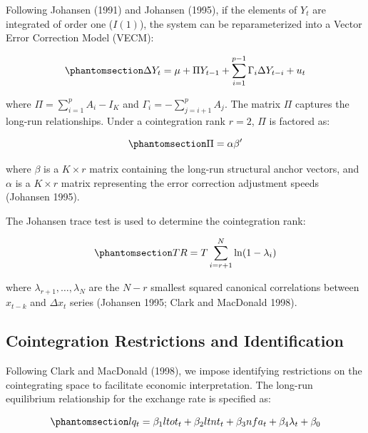 \documentclass[
  manuscript=article,
  layout=publish,
  year=2026,
  volume=6,
]{den}
\begin{document}
Following Johansen (1991) and Johansen (1995), if the elements of
\(Y_t\) are integrated of order one (\(I(1)\)), the system can be
reparameterized into a Vector Error Correction Model (VECM):

\begin{equation}\phantomsection\label{eq-vecm-general}{
\Delta Y_t = \mu + \Pi Y_{t-1} + \sum_{i=1}^{p-1} \Gamma_i \Delta Y_{t-i} + u_t
}\end{equation}

where \(\Pi = \sum_{i=1}^{p} A_i - I_K\) and
\(\Gamma_i = -\sum_{j=i+1}^{p} A_j\). The matrix \(\Pi\) captures the
long-run relationships. Under a cointegration rank \(r = 2\), \(\Pi\) is
factored as:

\begin{equation}\phantomsection\label{eq-pi-factorization}{
\Pi = \alpha \beta'
}\end{equation}

where \(\beta\) is a \(K \times r\) matrix containing the long-run
structural anchor vectors, and \(\alpha\) is a \(K \times r\) matrix
representing the error correction adjustment speeds (Johansen 1995).

The Johansen trace test is used to determine the cointegration rank:

\begin{equation}\phantomsection\label{eq-trace-test}{
TR = T\sum_{i=r+1}^{N} \ln(1 - \lambda_i)
}\end{equation}

where \(\lambda_{r+1}, \dots, \lambda_N\) are the \(N-r\) smallest
squared canonical correlations between \(x_{t-k}\) and \(\Delta x_t\)
series (Johansen 1995; Clark and MacDonald 1998).

\subsection{Cointegration Restrictions and
Identification}\label{cointegration-restrictions-and-identification}

Following Clark and MacDonald (1998), we impose identifying restrictions
on the cointegrating space to facilitate economic interpretation. The
long-run equilibrium relationship for the exchange rate is specified as:

\begin{equation}\phantomsection\label{eq-cointegrating-vector1}{
lq_t = \beta_1 ltot_t + \beta_2 ltnt_t + \beta_3 nfa_t + \beta_4 \lambda_t + \beta_0
}\end{equation}
\end{document}
